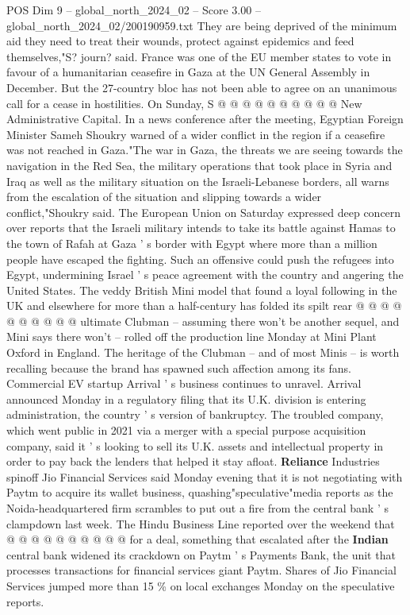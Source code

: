 \begin{textsample}{POS Dim 9 – global\_north\_2024\_02 – Score 3.00 – global\_north\_2024\_02/200190959.txt}
They are being deprived of the minimum aid they need to treat their wounds, protect against epidemics and feed themselves,"S? journ? said.
France was one of the EU member states to vote in favour of a humanitarian ceasefire in Gaza at the UN General Assembly in December.
But the 27-country bloc has not been able to agree on an unanimous call for a cease in hostilities.
On Sunday, S @ @ @ @ @ @ @ @ @ @ New Administrative Capital.
In a news conference after the meeting, Egyptian Foreign Minister Sameh Shoukry warned of a wider conflict in the region if a ceasefire was not reached in Gaza."The war in Gaza, the threats we are seeing towards the navigation in the Red Sea, the military operations that took place in Syria and Iraq as well as the military situation on the Israeli-Lebanese borders, all warns from the escalation of the situation and slipping towards a wider conflict,"Shoukry said.
The European Union on Saturday expressed deep concern over reports that the Israeli military intends to take its battle against Hamas to the town of Rafah at Gaza ' s border with Egypt where more than a million people have escaped the fighting.
Such an offensive could push the refugees into Egypt, undermining Israel ' s peace agreement with the country and angering the United States.
The veddy British Mini model that found a loyal following in the UK and elsewhere for more than a half-century has folded its spilt rear @ @ @ @ @ @ @ @ @ @ ultimate Clubman -- assuming there won't be another sequel, and Mini says there won't -- rolled off the production line Monday at Mini Plant Oxford in England.
The heritage of the Clubman -- and of most Minis -- is worth recalling because the brand has spawned such affection among its fans.
Commercial EV startup Arrival ' s business continues to unravel.
Arrival announced Monday in a regulatory filing that its U.K. division is entering administration, the country ' s version of bankruptcy.
The troubled company, which went public in 2021 via a merger with a special purpose acquisition company, said it ' s looking to sell its U.K. assets and intellectual property in order to pay back the lenders that helped it stay afloat. \textbf{Reliance} Industries spinoff Jio Financial Services said Monday evening that it is not negotiating with Paytm to acquire its wallet business, quashing"speculative"media reports as the Noida-headquartered firm scrambles to put out a fire from the central bank ' s clampdown last week.
The Hindu Business Line reported over the weekend that @ @ @ @ @ @ @ @ @ @ for a deal, something that escalated after the \textbf{Indian} central bank widened its crackdown on Paytm ' s Payments Bank, the unit that processes transactions for financial services giant Paytm.
Shares of Jio Financial Services jumped more than 15 \% on local exchanges Monday on the speculative reports.

\end{textsample}
